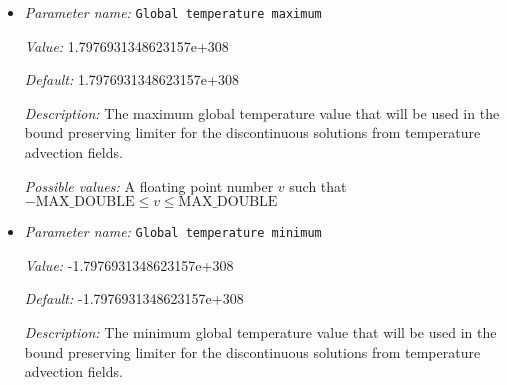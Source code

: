 \begin{itemize}
{\it Value:} -1.7976931348623157e+308


{\it Default:} -1.7976931348623157e+308


{\it Description:} The minimum global composition value that will be used in the bound preserving limiter for the discontinuous solutions from composition advection fields. The number of the input 'Global composition minimum' values separated by ',' has to be the same as the number of the compositional fields


{\it Possible values:} A list of 0 to 4294967295 elements where each element is [A floating point number $v$ such that $-\text{MAX\_DOUBLE} \leq v \leq \text{MAX\_DOUBLE}$]
\item {\it Parameter name:} {\tt Global temperature maximum}
\label{parameters:Discretization/Stabilization parameters/Global temperature maximum}
\label{parameters:Discretization/Stabilization_20parameters/Global_20temperature_20maximum}


{\it Value:} 1.7976931348623157e+308


{\it Default:} 1.7976931348623157e+308


{\it Description:} The maximum global temperature value that will be used in the bound preserving limiter for the discontinuous solutions from temperature advection fields.


{\it Possible values:} A floating point number $v$ such that $-\text{MAX\_DOUBLE} \leq v \leq \text{MAX\_DOUBLE}$
\item {\it Parameter name:} {\tt Global temperature minimum}
\label{parameters:Discretization/Stabilization parameters/Global temperature minimum}
\label{parameters:Discretization/Stabilization_20parameters/Global_20temperature_20minimum}


{\it Value:} -1.7976931348623157e+308


{\it Default:} -1.7976931348623157e+308


{\it Description:} The minimum global temperature value that will be used in the bound preserving limiter for the discontinuous solutions from temperature advection fields.



\end{itemize}
